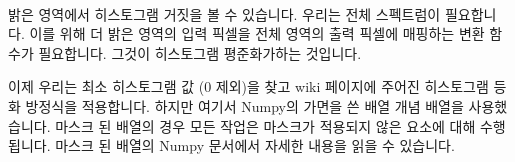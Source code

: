 \documentclass[11pt]{article}
\begin{document}
    \begin{center}
    \end{center}
    { \hspace*{\fill} \\}
    
    밝은 영역에서 히스토그램 거짓을 볼 수 있습니다. 우리는 전체 스펙트럼이
필요합니다. 이를 위해 더 밝은 영역의 입력 픽셀을 전체 영역의 출력 픽셀에
매핑하는 변환 함수가 필요합니다. 그것이 히스토그램 평준화가하는
것입니다.

이제 우리는 최소 히스토그램 값 (0 제외)을 찾고 wiki 페이지에 주어진
히스토그램 등화 방정식을 적용합니다. 하지만 여기서 Numpy의 가면을 쓴
배열 개념 배열을 사용했습니다. 마스크 된 배열의 경우 모든 작업은
마스크가 적용되지 않은 요소에 대해 수행됩니다. 마스크 된 배열의 Numpy
문서에서 자세한 내용을 읽을 수 있습니다.
\end{document}
